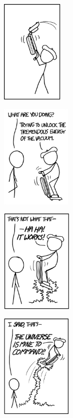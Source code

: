 

\begin{figure}[b]
    \centering
    \begin{subfigure}{.24\textwidth}
	\includegraphics[height=5cm]{bilder/vacuum_1.png}
    \end{subfigure}
    \begin{subfigure}{.24\textwidth}
	\includegraphics[height=5cm]{bilder/vacuum_2.png}
    \end{subfigure}
    \begin{subfigure}{.24\textwidth}
	\includegraphics[height=5cm]{bilder/vacuum_3.png}
    \end{subfigure}
    \begin{subfigure}{.24\textwidth}
	\includegraphics[height=5cm]{bilder/vacuum_4.png}
    \end{subfigure}
\end{figure}

